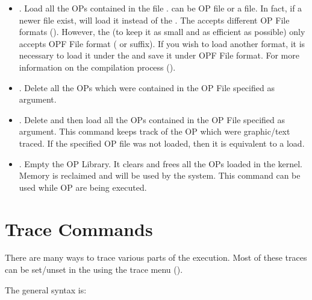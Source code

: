 \begin{itemize}
\item {}. Load all the OPs contained in the
  file .  can be  OP file or a
   file. In fact, if a newer  file exist, \CPK{}
  will load it instead of the . The \OPEditor{} accepts different
  OP File formats (). However, the \CPK{} (to keep it
  as small and as efficient as possible) only accepts OPF File format
  ( or  suffix). If you wish to load another format,
  it is necessary to load it under the \OPEditor{} and save it under OPF
  File format. For more information on the compilation process
  ().

\item {}. Delete all the OPs which
were contained in the OP File specified as argument.

\item {}.  Delete and then load all the OPs
contained in the OP File specified as argument. This command keeps track of the
OP which were graphic/text traced. If the specified OP file was not loaded,
then it is equivalent to a load.

\item {}. Empty the OP Library. It clears and frees all the
OPs loaded in the kernel. Memory is reclaimed and will be used by the
system. This command can be used while OP are being executed.

\end{itemize}

\section{\CPK{} Trace Commands}

There are many ways to trace various parts of the \CPK{} execution.
Most of these traces can be set/unset in the \XPK{} using the trace
menu (). 

The general syntax is:


